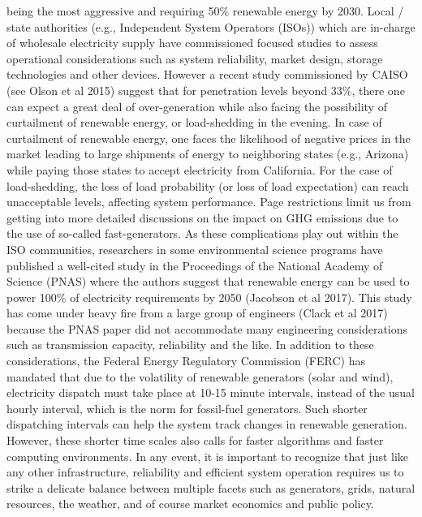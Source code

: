 \documentclass[11pt,a4paper]{article}
\begin{document}
being the most aggressive and requiring 50\% renewable energy by 2030. Local / state authorities (e.g., Independent System Operators (ISOs)) which are in-charge of wholesale electricity supply have commissioned focused studies to assess operational considerations such as system reliability, market design, storage technologies and other devices.  However a recent study commissioned by CAISO (see Olson et al 2015) suggest that for penetration levels beyond 33\%, there one can expect a great deal of over-generation  while also facing the possibility of curtailment of renewable energy, or load-shedding in the evening.  In case of curtailment of renewable energy, one faces the likelihood of negative prices in the market leading to large shipments of energy to neighboring states (e.g., Arizona) while paying those states to accept electricity from California. For the case of load-shedding, the loss of load probability (or loss of load expectation) can reach unacceptable levels, affecting system performance.  Page restrictions limit us from getting into more detailed discussions on the impact on GHG emissions due to the use of so-called fast-generators.  As these complications play out within the ISO communities, researchers in some environmental science programs have published a well-cited study in the Proceedings of the National Academy of Science (PNAS) where the authors suggest that renewable energy can be used to power 100\% of electricity requirements by 2050  (Jacobson et al 2017).  This study has come under heavy fire from a large group of engineers (Clack et al 2017) because the PNAS paper did not accommodate many engineering considerations such as transmission capacity, reliability and the like.   In addition to these considerations, the Federal Energy Regulatory Commission (FERC) has mandated that due to the volatility of renewable generators (solar and wind), electricity dispatch must take place at 10-15 minute intervals, instead of the usual hourly interval, which is the norm for fossil-fuel generators.  Such shorter dispatching intervals can help the system track changes in renewable generation.  However, these shorter time scales also calls for faster algorithms and faster computing environments.  In any event, it is important to recognize that just like any other infrastructure, reliability and efficient system operation requires us to strike a delicate balance between multiple facets such as generators, grids, natural resources, the weather, and of course market economics and public policy.  
\end{document}

